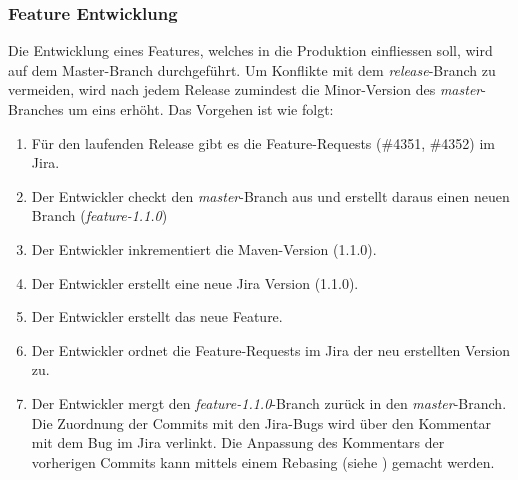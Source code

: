 \subsubsection{Feature Entwicklung}
Die Entwicklung eines Features, welches in die Produktion einfliessen soll, wird auf dem Master-Branch durchgeführt. Um Konflikte mit dem \textit{release}-Branch zu vermeiden, wird nach jedem Release zumindest die Minor-Version des \textit{master}-Branches um eins erhöht.  Das Vorgehen ist wie folgt:
\begin{enumerate}
\item Für den laufenden Release gibt es die Feature-Requests (\#4351, \#4352) im Jira.
\item Der Entwickler checkt den \textit{master}-Branch aus und erstellt daraus einen neuen Branch (\textit{feature-1.1.0})
\item Der Entwickler inkrementiert die Maven-Version (1.1.0).
\item Der Entwickler erstellt eine neue Jira Version (1.1.0).
\item Der Entwickler erstellt das neue Feature.
\item Der Entwickler ordnet die Feature-Requests im Jira der neu erstellten Version zu.
\item Der Entwickler mergt den \textit{feature-1.1.0}-Branch zurück in den \textit{master}-Branch.  Die Zuordnung der Commits mit den Jira-Bugs wird über den Kommentar mit dem Bug im Jira verlinkt. Die Anpassung des Kommentars der vorherigen Commits kann mittels einem Rebasing (siehe \cite{dilger201111}) gemacht werden.
\end{enumerate}